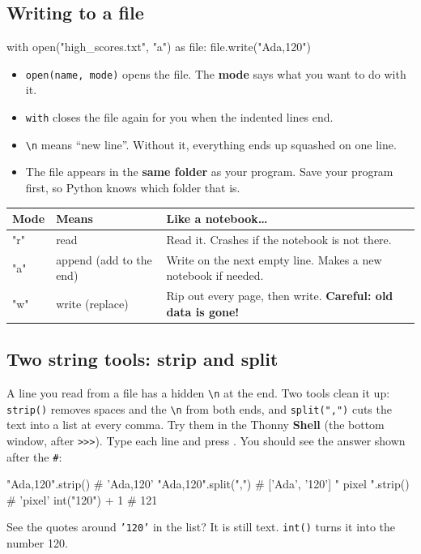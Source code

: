 \subsection{Writing to a file}
\begin{pycode}
with open("high_scores.txt", "a") as file:
    file.write("Ada,120\n")
\end{pycode}
\begin{itemize}[leftmargin=1.2em]
  \item \texttt{open(name, mode)} opens the file. The \textbf{mode} says what you want to do with it.
  \item \texttt{with} closes the file again for you when the indented lines end.
  \item \texttt{\textbackslash n} means \enquote{new line}. Without it, everything ends up squashed on one line.
  \item The file appears in the \textbf{same folder} as your program. Save your program first, so Python knows which folder that is.
\end{itemize}

\begin{center}
\renewcommand{\arraystretch}{1.3}
\begin{tabular}{@{}>{\ttfamily}l p{4.2cm} p{6.4cm}@{}}
\toprule
\textrm{\textbf{Mode}} & \textbf{Means} & \textbf{Like a notebook\ldots} \\ \midrule
"r" & read & Read it. Crashes if the notebook is not there. \\
"a" & append (add to the end) & Write on the next empty line. Makes a new notebook if needed. \\
"w" & write (replace) & Rip out every page, then write. \textbf{Careful: old data is gone!} \\
\bottomrule
\end{tabular}
\end{center}

\subsection{Two string tools: strip and split}
A line you read from a file has a hidden \texttt{\textbackslash n} at the end. Two tools clean it up:
\texttt{strip()} removes spaces and the \texttt{\textbackslash n} from both ends, and \texttt{split(",")} cuts the text
into a list at every comma. Try them in the Thonny \textbf{Shell} (the bottom window, after \texttt{>>>}).
Type each line and press . You should see the answer shown after the \texttt{\#}:
\begin{pycode}
"Ada,120\n".strip()         # 'Ada,120'
"Ada,120".split(",")        # ['Ada', '120']
"  pixel  ".strip()         # 'pixel'
int("120") + 1              # 121
\end{pycode}
See the quotes around \texttt{'120'} in the list? It is still text. \texttt{int()} turns it into the number 120.

